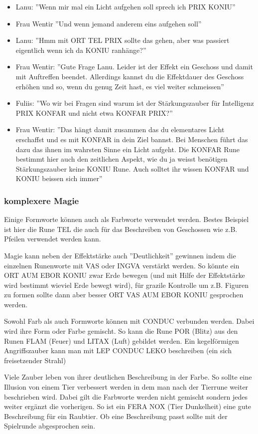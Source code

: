 \documentclass{article}
\begin{document}
\begin{itemize}
\item Lanu: ''Wenn mir mal ein Licht aufgehen soll sprech ich PRIX KONIU''
\item Frau Wentir ''Und wenn jemand anderem eins aufgehen soll''
\item Lanu: ''Hmm mit ORT TEL PRIX sollte das gehen, aber was passiert eigentlich wenn ich da KONIU ranhänge?''
\item Frau Wentir: ''Gute Frage Lanu. Leider ist der Effekt ein Geschoss und damit mit Auftreffen beendet. Allerdings kannst du die Effektdauer des Geschoss erhöhen und so, wenn du genug Zeit hast, es viel weiter schmeissen''
\item Fuliis: ''Wo wir bei Fragen sind warum ist der Stärkungszauber für Intelligenz PRIX KONFAR und nicht etwa KONFAR PRIX?''
\item Frau Wentir: ''Das hängt damit zusammen das du elementares Licht erschaffst und es mit KONFAR in dein Ziel bannst. Bei Menschen führt das dazu das ihnen im wahrsten Sinne ein Licht aufgeht. Die KONFAR Rune bestimmt hier auch den zeitlichen Aspekt, wie du ja weisst benötigen Stärkungszauber keine KONIU Rune. Auch solltet ihr wissen KONFAR und KONIU beissen sich immer''
\end{itemize}

\subsubsection{komplexere Magie}

Einige Formworte können auch als Farbworte verwendet werden. Bestes Beispiel ist hier die Rune TEL die auch für das
Beschreiben von Geschossen wie z.B. Pfeilen verwendet werden kann.

Magie kann neben der Effektstärke auch ''Deutlichkeit'' gewinnen indem die einzelnen Runenworte mit VAS oder INGVA
verstärkt werden. So könnte ein ORT AUM EBOR KONIU zwar Erde bewegen (und mit Hilfe der Effektstärke wird bestimmt
wieviel Erde bewegt wird), für grazile Kontrolle um z.B. Figuren zu formen sollte dann aber besser 
ORT VAS AUM EBOR KONIU gesprochen werden.

Sowohl Farb als auch Formworte können mit CONDUC verbunden werden. Dabei wird ihre Form oder Farbe gemischt. So kann
die Rune POR (Blitz) aus den Runen FLAM (Feuer) und LITAX (Luft) gebildet werden. Ein kegelförmigen Angriffszauber
kann man mit LEP CONDUC LEKO beschreiben (ein sich freisetzender Strahl)

Viele Zauber leben von ihrer deutlichen Beschreibung in der Farbe. So sollte eine Illusion von einem Tier verbessert
werden in dem man nach der Tierrune weiter beschrieben wird. Dabei gilt die Farbworte werden nicht gemischt sondern
jedes weiter ergänzt die vorherigen. So ist ein FERA NOX (Tier Dunkelheit) eine gute Beschreibung für ein Raubtier.
Ob eine Beschreibung passt sollte mit der Spielrunde abgesprochen sein.
\end{document}
